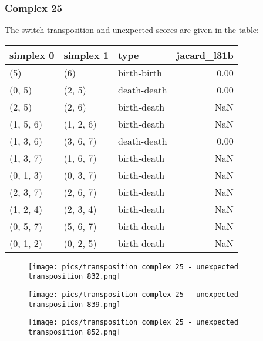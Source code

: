 \documentclass{article}
\begin{document}
\subsubsection{Complex 25}
\par The switch transposition and unexpected scores are given in the table:
\begin{center}
\begin{tabular}{lllr}
\toprule
simplex 0 & simplex 1 & type & jacard\_l31b \\
\midrule
(5) & (6) & birth-birth & 0.00 \\
(0, 5) & (2, 5) & death-death & 0.00 \\
(2, 5) & (2, 6) & birth-death & NaN \\
(1, 5, 6) & (1, 2, 6) & birth-death & NaN \\
(1, 3, 6) & (3, 6, 7) & death-death & 0.00 \\
(1, 3, 7) & (1, 6, 7) & birth-death & NaN \\
(0, 1, 3) & (0, 3, 7) & birth-death & NaN \\
(2, 3, 7) & (2, 6, 7) & birth-death & NaN \\
(1, 2, 4) & (2, 3, 4) & birth-death & NaN \\
(0, 5, 7) & (5, 6, 7) & birth-death & NaN \\
(0, 1, 2) & (0, 2, 5) & birth-death & NaN \\
\bottomrule
\end{tabular}
\end{center}

\begin{figure}[ht]
\centering
\texttt{[image: pics/transposition complex 25 - unexpected transposition 832.png]}
\end{figure}


\begin{figure}[ht]
\centering
\texttt{[image: pics/transposition complex 25 - unexpected transposition 839.png]}
\end{figure}


\begin{figure}[ht]
\centering
\texttt{[image: pics/transposition complex 25 - unexpected transposition 852.png]}
\end{figure}
\end{document}
